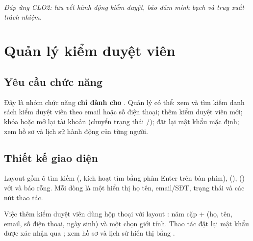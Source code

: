 \textit{Đáp ứng CLO2: lưu vết hành động kiểm duyệt, bảo đảm minh bạch và truy
xuất trách nhiệm.}

\section{Quản lý kiểm duyệt viên}

\subsection{Yêu cầu chức năng}
Đây là nhóm chức năng \textbf{chỉ dành cho }. Quản lý có thể: xem
và tìm kiếm danh sách kiểm duyệt viên theo email hoặc số điện thoại; thêm kiểm
duyệt viên mới; khóa hoặc mở lại tài khoản (chuyển trạng thái
/); đặt lại mật khẩu mặc định; xem hồ sơ và lịch sử
hành động của từng người.

\subsection{Thiết kế giao diện}
Layout  gồm  ô tìm
kiếm (, kích hoạt tìm bằng phím Enter trên bàn phím),
  (),
 () với  và
 báo rỗng. Mỗi dòng là một  hiển thị họ
tên, email/SĐT, trạng thái và các nút thao tác.

Việc thêm kiểm duyệt viên dùng hộp thoại  với layout
: năm cặp  +
 (họ, tên, email, số điện thoại, ngày sinh) và một
 chọn giới tính. Thao tác đặt lại mật khẩu được xác nhận qua
; xem hồ sơ và lịch sử hiển thị bằng .


